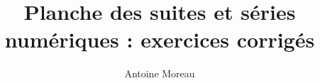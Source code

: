 \documentclass[a4paper,10pt]{article}
\title{Planche des suites et s\'eries num\'eriques : exercices corrig\'es}
\author{Antoine Moreau}
\begin{document}
\maketitle

\begin{abstract}

\end{abstract}


\end{document}
